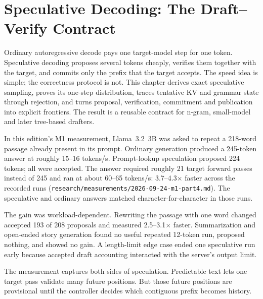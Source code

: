 \chapter{Speculative Decoding: The Draft--Verify Contract}\label{ch:speculative-decoding}

\begin{ChapterIntent}
Ordinary autoregressive decode pays one target-model step for one token. Speculative
decoding proposes several tokens cheaply, verifies them together with the target, and
commits only the prefix that the target accepts. The speed idea is simple; the
correctness protocol is not. This chapter derives exact speculative sampling, proves
its one-step distribution, traces tentative KV and grammar state through rejection,
and turns proposal, verification, commitment and publication into explicit frontiers.
The result is a reusable contract for n-gram, small-model and later tree-based drafters.
\end{ChapterIntent}


In this edition's M1 measurement, Llama~3.2~3B was asked to repeat a 218-word passage
already present in its prompt. Ordinary generation produced a 245-token answer at
roughly 15--16 tokens/s. Prompt-lookup speculation proposed 224 tokens; all were
accepted. The answer required roughly 21 target forward passes instead of 245 and ran
at about 60--65 tokens/s: 3.7--4.3$\times$ faster across the recorded runs
(\texttt{research/measurements/2026-09-24-m1-part4.md}). The speculative and ordinary
answers matched character-for-character in those runs.

The gain was workload-dependent. Rewriting the passage with one word changed accepted
193 of 208 proposals and measured 2.5--3.1$\times$ faster. Summarization and open-ended
story generation found no useful repeated 12-token run, proposed nothing, and showed
no gain. A length-limit edge case ended one speculative run early because accepted
draft accounting interacted with the server's output limit.

The measurement captures both sides of speculation. Predictable text lets one target
pass validate many future positions. But those future positions are provisional until
the controller decides which contiguous prefix becomes history.


